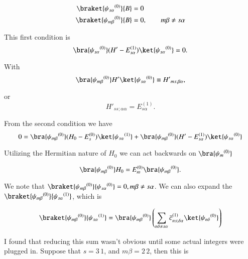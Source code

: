 \begin{align}\label{eqn:qmTwoL5a:460}
\braket{{\psi_{s \alpha}}^{(0)}}{B} &= 0 \\
\braket{{\psi_{m \beta}}^{(0)}}{B} &= 0, \qquad m \beta \ne s \alpha
\end{align}

This first condition is
\begin{equation}\label{eqn:qmTwoL5a:480}
\bra{{\psi_{s \alpha}}^{(0)}} (H' - E_{s \alpha}^{(1)}) \ket{{\psi_{s \alpha}}^{(0)}} = 0.
\end{equation}

With
\begin{equation}\label{eqn:qmTwoL5a:500}
\bra{{\psi_{m \beta}}^{(0)}} H' \ket{{\psi_{s \alpha}}^{(0)}} \equiv {H'}_{ms ; \beta \alpha},
\end{equation}

or
\begin{equation}\label{eqn:qmTwoL5a:520}
{H'}_{ss ; \alpha \alpha} = E_{s \alpha}^{(1)}.
\end{equation}

From the second condition we have
\begin{equation}\label{eqn:qmTwoL5a:540}
0 = \bra{{\psi_{m \beta}}^{(0)}} 
(H_0 - E_s^{(0)}) \ket{{\psi_{s \alpha}}^{(1)}} 
+\bra{{\psi_{m \beta}}^{(0)}} 
(H' - E_{s \alpha}^{(1)}) \ket{{\psi_{s \alpha}}^{(0)}} 
\end{equation}

Utilizing the Hermitian nature of $H_0$ we can act backwards on $\bra{{\psi_m}^{(0)}}$ 

\begin{equation}\label{eqn:qmTwoL5a:560}
\bra{{\psi_{m \beta}}^{(0)}} H_0
=
E_m^{(0)} \bra{{\psi_{m \beta}}^{(0)}}.
\end{equation}

We note that $\braket{{\psi_{m \beta}}^{(0)}}{{\psi_{s \alpha}}^{(0)}} = 0, m \beta \ne s \alpha$.  We can also expand the $\braket{{\psi_{m \beta}}^{(0)}}{{\psi_{s \alpha}}^{(1)}}$, which is

\begin{align*}
\braket{{\psi_{m \beta}}^{(0)}}{{\psi_{s \alpha}}^{(1)}} 
&=
\bra{{\psi_{m \beta}}^{(0)}}
\left(
\sum_{n\delta \ne s\alpha} {\bar{c}_{ns;\delta \alpha}}^{(1)} \ket{{\psi_{n \delta}}^{(0)}}
\right) \\
\end{align*}

I found that reducing this sum wasn't obvious until some actual integers were plugged in.  Suppose that $s = 3\,1$, and $m \beta = 2\,2$, then this is

